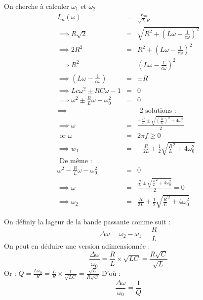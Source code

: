 \begin{corollary}
    On cherche à calculer \(\omega_{1}\) et \(\omega_{2}\)  
    \begin{eqnarray*}
        I_{m}(\omega ) &=& \frac{E_{m}}{\sqrt{L}R} \\
        \implies R \sqrt{2} &=& \sqrt{R^{2} + (L \omega -\frac{1}{c \omega })^{2}} \\
        \implies 2R^{2} &=& R^{2} + (L \omega -\frac{1}{c \omega })^{2} \\
        \implies R^{2} &=& (L \omega -\frac{1}{c \omega })^{2} \\
        \implies  (L \omega -\frac{1}{c \omega })  &=& \pm R \\
        \implies  Lc \omega^{2} \pm RC \omega  -1 &=& 0 \\
        \implies \omega^{2} \pm \frac{R}{L} \omega - \omega_{0}^{2} &=& 0 \\
        \implies &&\text{ 2 solutions : } \\
        \implies \omega  &=& \frac{-\frac{R}{L} \pm \sqrt{(\frac{R}{L})^{2} + 4\omega^{2}}}{2} \\
        \text{ or } \omega &=& 2 \pi f \geq 0 \\
        \implies w_{1} &=& -\frac{R}{2L} + \frac{1}{2} \sqrt{\frac{R}{L}^{2} + 4 \omega_{0}^{2}} \\
        \text{ De même : } && \\
        \omega^{2} -\frac{R}{L} \omega - \omega_{0}^{2} &=& 0 \\
        \implies \omega &=& \frac{\frac{R}{L} \pm \sqrt{\frac{R}{L}^{2} + 4\omega _{0}^{2}}}{2} = 0 \\
        \implies  \omega _{2} &=& \frac{R}{2L} +\frac{1}{2}\sqrt{\frac{R}{L}^{2} + 4\omega_{0}^{2}}
    \end{eqnarray*}
\end{corollary}


\begin{definition} On définiy la lageur de la bande passante comme suit : 
    \[
        \Delta \omega = \omega_{2} - \omega _{1} = \frac{R}{L}
    \]
    On peut en déduire une version adimensionnée : 
    \[
        \frac{\Delta \omega }{\omega_{0}} = \frac{R}{L} \times \sqrt{LC} = \frac{R\sqrt{C}}{\sqrt{L}}
    \]
    Or : \(Q = \frac{L \omega _{0}}{R} = \frac{L}{R} \times \frac{1}{\sqrt{LC}} = \frac{\sqrt{L}}{R\sqrt{C}}\) 
    D'où : 
    \[
        \frac{\Delta \omega }{\omega _{0}} = \frac{1}{Q}
    \]
\end{definition}

